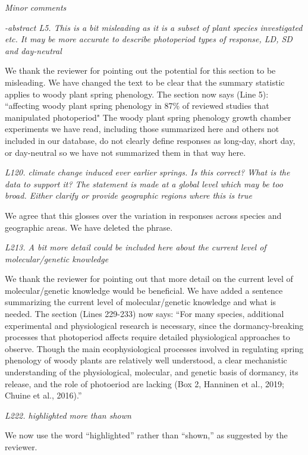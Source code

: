 \documentclass{article}
\begin{document}
\par \emph{Minor comments}
\par \emph{-abstract L5. This is a bit misleading as it is a subset of plant species investigated etc. It may be more accurate to describe photoperiod types of response, LD, SD and day-neutral}

\par We thank the reviewer for pointing out the potential for this section to be misleading. We have changed the text to be clear that the summary statistic applies to woody plant spring phenology. The section now says (Line 5): 
``affecting woody plant spring phenology in 87\% of reviewed studies that manipulated photoperiod"
The woody plant spring phenology growth chamber experiments we have read, including those summarized here and others not included in our database, do not clearly define responses as long-day, short day, or day-neutral so we have not summarized them in that way here. 
\par \emph{L120. climate change induced ever earlier springs. Is this correct? What is the data to support it? The statement is made at a global level which may be too broad. Either clarify or provide geographic regions where this is true}
\par We agree that this glosses over the variation in responses across species and geographic areas. We have deleted the phrase. 

\par \emph{L213. A bit more detail could be included here about the current level of molecular/genetic knowledge}
\par We thank the reviewer for pointing out that more detail on the current level of molecular/genetic knowledge would be beneficial. We have added a sentence summarizing the current level of molecular/genetic knowledge and what is needed. The section (Lines 229-233) now says:
``For many species, additional experimental and physiological research is necessary, since the dormancy-breaking processes that photoperiod affects require detailed physiological approaches to observe. Though the main ecophysiological processes involved in regulating spring phenology of woody plants are relatively well understood, a clear mechanistic understanding of the physiological, molecular, and genetic basis of dormancy, its release, and the role of photoeriod are lacking  (Box 2, Hanninen et al., 2019; Chuine et al., 2016).''

\par \emph{L222. highlighted more than shown}
\par We now use the word ``highlighted'' rather than ``shown,'' as suggested by the reviewer.
\end{document}
